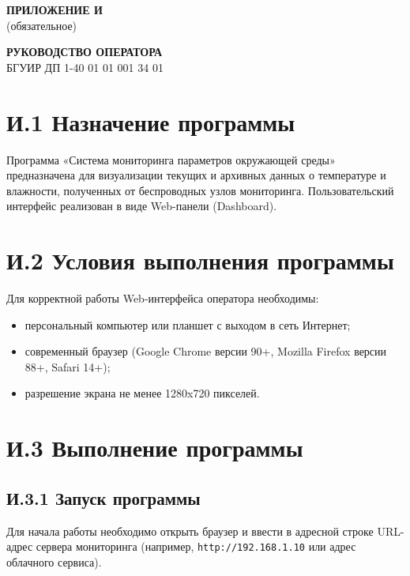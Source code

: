 \newpage
\begin{flushright}
    {\bfseries ПРИЛОЖЕНИЕ И} \\
    (обязательное)
\end{flushright}

\begin{center}
    {\bfseries РУКОВОДСТВО ОПЕРАТОРА} \\
    \vspace{0.2cm}
    БГУИР ДП 1-40 01 01 001 34 01
\end{center}


\section*{И.1 Назначение программы}

Программа «Система мониторинга параметров окружающей среды» предназначена для визуализации текущих и архивных данных о температуре и влажности, полученных от беспроводных узлов мониторинга. Пользовательский интерфейс реализован в виде Web-панели (Dashboard).

\section*{И.2 Условия выполнения программы}

Для корректной работы Web-интерфейса оператора необходимы:
\begin{itemize}
    \item персональный компьютер или планшет с выходом в сеть Интернет;
    \item современный браузер (Google Chrome версии 90+, Mozilla Firefox версии 88+, Safari 14+);
    \item разрешение экрана не менее 1280x720 пикселей.
\end{itemize}

\section*{И.3 Выполнение программы}

\subsection*{И.3.1 Запуск программы}
Для начала работы необходимо открыть браузер и ввести в адресной строке URL-адрес сервера мониторинга (например, \texttt{http://192.168.1.10} или адрес облачного сервиса). 


